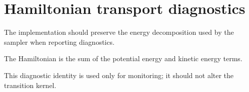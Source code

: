 \section{Hamiltonian transport diagnostics}
The implementation should preserve the energy decomposition used by the sampler when reporting diagnostics.

\begin{proposition}\label{prop:hamiltonian-energy}
The Hamiltonian is the sum of the potential energy and kinetic energy terms.
\end{proposition}

This diagnostic identity is used only for monitoring; it should not alter the transition kernel.
